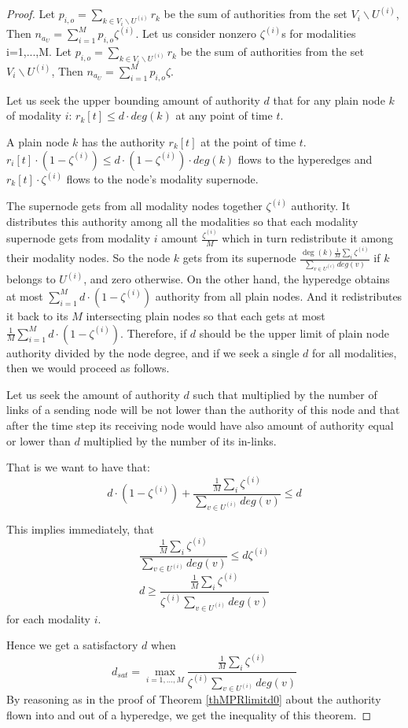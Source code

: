 \documentclass{fundam}
\newcommand{\N}{ V }
\begin{document}
\begin{proof}
Let  $p_{i,o}=\sum_{k \in \N_i \backslash U^{(i)}}r_k$ be the sum of authorities from the set $\N_i \backslash U^{(i)}$,
Then $n_{a_U}=\sum_{i=1}^M p_{i,o}\zeta^{(i)}$.
Let us consider nonzero   $\zeta^{(i)}$s for modalities i=1,...,M.
Let  $p_{i,o}=\sum_{k \in \N_i \backslash U^{(i)}}r_k$ be the sum of authorities from the set $\N_i \backslash U^{(i)}$,
Then $n_{a_U}=\sum_{i=1}^M p_{i,o}\zeta$.

\medskip
Let us seek the upper bounding amount of authority $d$
that for any plain node $k$ of modality $i$: $r_{k}[t]\le d\cdot deg(k)$ at any point of time $t$.

 A plain node $k$ has the authority $r_{k}[t]$ at the point of time $t$. $r_{i}[t]\cdot (1-\zeta^{(i)} )\le d\cdot (1-\zeta^{(i)} )\cdot deg(k)$ flows to the hyperedges and $r_{k}[t]\cdot \zeta^{(i)} $ flows to the node's modality supernode.

The supernode gets from all modality nodes together $\zeta^{(i)} $ authority.
It distributes this authority among all the modalities so that each modality supernode gets from modality $i$ amount $\frac{\zeta^{(i)}}{M}$ which in turn redistribute it among their modality nodes.
So the node $k$ gets from its supernode
$ \frac{
\deg(k)
   \frac1M
   \sum_i\zeta^{(i)} }
   {
\sum_{v \in U^{(i)}}deg(v)} $
 if $k$ belongs to $U^{(i)}$, and zero otherwise.  On the other hand, the hyperedge obtains at most $\sum_{i=1}^M d\cdot(1-\zeta^{(i)} )$ authority from all plain nodes. And it redistributes it back to its $M$ intersecting plain nodes so that each gets at most
 $\frac{1}{M}\sum_{i=1}^M d\cdot(1-\zeta^{(i)} )$.
 Therefore, if $d$ should be the upper limit of plain node authority divided by the node degree,
and if   we seek   a single $d$ for all modalities, then we would proceed as follows.


Let us seek the amount of authority $d$ such that multiplied by the number of  links of a sending node will be not lower than the authority of this node and that after the time step
its receiving node would have also amount of authority equal or lower than $d$ multiplied by the number of its in-links.

\medskip
That is we want to have that:
$$ d{\cdot}(1-\zeta^{(i)} ) +
 \frac{\frac1M\sum_i\zeta^{(i)} }{\sum_{v \in U^{(i)}}deg(v)}  \le d $$

This implies immediately, that %
$$
 \frac{\frac1M\sum_i\zeta^{(i)} }{\sum_{v \in U^{(i)}}deg(v)}  \le d \zeta^{(i)}$$
$$  d\ge
 \frac{\frac1M\sum_i\zeta^{(i)} }{\zeta^{(i)}\sum_{v \in U^{(i)}}deg(v)}   $$
 for each modality $i$.

\eject
Hence we get  a satisfactory $d$ when
$$d_{sat}=
\max_{i=1,...,M}
 \frac{\frac1M\sum_i\zeta^{(i)} }{\zeta^{(i)}\sum_{v \in U^{(i)}}deg(v)}   $$
By reasoning as in the proof of Theorem \ref{thMPRlimitd0} about the authority flown into and out of a hyperedge, we get the inequality of this theorem.
 \end{proof}
\end{document}
